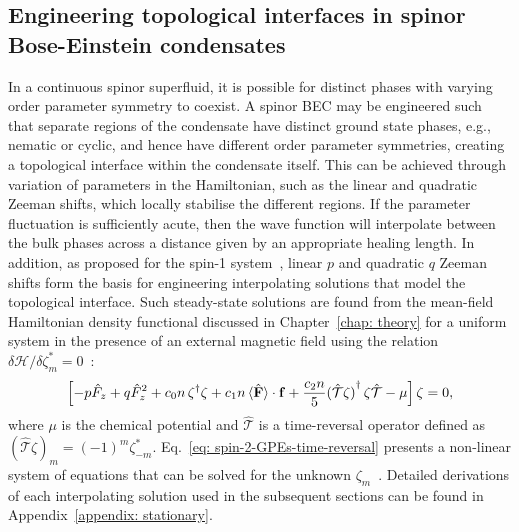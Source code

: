 \subsection{Engineering topological interfaces in spinor Bose-Einstein
condensates}
In a continuous spinor superfluid, it is possible for distinct phases with
varying order parameter symmetry to coexist.
A spinor BEC may be engineered such that separate regions of the condensate
have distinct ground state phases, e.g., nematic or cyclic, and hence have
different order parameter symmetries, creating a topological interface within
the condensate itself.
This can be achieved through variation of parameters in the Hamiltonian, such as
the linear and quadratic Zeeman shifts, which locally stabilise the different
regions.
If the parameter fluctuation is sufficiently acute, then the wave function will
interpolate between the bulk phases across a distance given by an appropriate
healing length.
In addition, as proposed for the spin-1 system~\cite{Borgh2014}, linear \(p\)
and quadratic \(q\) Zeeman shifts form the basis for engineering interpolating
solutions that model the topological interface.
Such steady-state solutions are found from the mean-field Hamiltonian density
functional discussed in Chapter~\ref{chap: theory} for a uniform system in the
presence of an external magnetic field using the relation \(\delta \mathcal{H}
/ \delta \zeta_m^*=0\)~\cite{Kawaguchi2012}:
\begin{equation}\label{eq: spin-2-GPEs-time-reversal}
    \left[-p \hat{F}_z + q \hat{F}^2_z + c_0n \, \zeta^\dagger \zeta
        + c_1n \, \langle\hat{\vb{F}}\rangle\cdot \vb{f}
        + \frac{c_2n}{5}{(\hat{\mathcal{T}}\zeta)}^\dagger \,
        \zeta\hat{\mathcal{T}} -\mu \right] \zeta = 0,
\end{equation}
where \(\mu \) is the chemical potential and \(\hat{\mathcal{T}}\) is a
time-reversal operator defined as \({(\hat{\mathcal{T}}\zeta)}_m =
{(-1)}^m\zeta_{-m}^*\).
Eq.~\eqref{eq: spin-2-GPEs-time-reversal} presents a non-linear system of
equations that can be solved for the unknown
\(\zeta_m\)~\cite{Ciobanu2000,Kawaguchi2012}.
Detailed derivations of each interpolating solution used in the subsequent
sections can be found in Appendix~\ref{appendix: stationary}.

